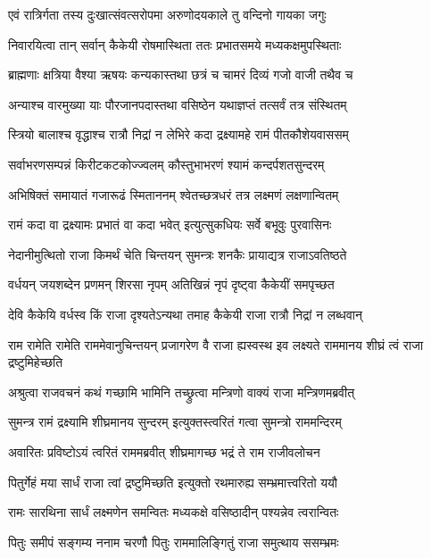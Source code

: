 \twolineshloka
{एवं रात्रिर्गता तस्य दुःखात्संवत्सरोपमा}
{अरुणोदयकाले तु वन्दिनो गायका जगुः} %

\twolineshloka
{निवारयित्वा तान् सर्वान् कैकेयी रोषमास्थिता}
{ततः प्रभातसमये मध्यकक्षमुपस्थिताः} %

\twolineshloka
{ब्राह्मणाः क्षत्रिया वैश्या ऋषयः कन्यकास्तथा}
{छत्रं च चामरं दिव्यं गजो वाजी तथैव च} %

\twolineshloka
{अन्याश्च वारमुख्या याः पौरजानपदास्तथा}
{वसिष्ठेन यथाज्ञप्तं तत्सर्वं तत्र संस्थितम्} %

\twolineshloka
{स्त्रियो बालाश्च वृद्धाश्च रात्रौ निद्रां न लेभिरे}
{कदा द्रक्ष्यामहे रामं पीतकौशेयवाससम्} %

\twolineshloka
{सर्वाभरणसम्पन्नं किरीटकटकोज्ज्वलम्}
{कौस्तुभाभरणं श्यामं कन्दर्पशतसुन्दरम्} %

\twolineshloka
{अभिषिक्तं समायातं गजारूढं स्मिताननम्}
{श्वेतच्छत्रधरं तत्र लक्ष्मणं लक्षणान्वितम्} %

\twolineshloka
{रामं कदा वा द्रक्ष्यामः प्रभातं वा कदा भवेत्}
{इत्युत्सुकधियः सर्वे बभूवुः पुरवासिनः} %

\twolineshloka
{नेदानीमुत्थितो राजा किमर्थं चेति चिन्तयन्}
{सुमन्त्रः शनकैः प्रायाद्यत्र राजाऽवतिष्ठते} %

\twolineshloka
{वर्धयन् जयशब्देन प्रणमन् शिरसा नृपम्}
{अतिखिन्नं नृपं दृष्ट्वा कैकेयीं समपृच्छत} %

\twolineshloka
{देवि कैकेयि वर्धस्व किं राजा दृश्यतेऽन्यथा}
{तमाह कैकेयी राजा रात्रौ निद्रां न लब्धवान्} %

\threelineshloka
{राम रामेति रामेति राममेवानुचिन्तयन्}
{प्रजागरेण वै राजा ह्यस्वस्थ इव लक्ष्यते}
{राममानय शीघ्रं त्वं राजा द्रष्टुमिहेच्छति} %

\twolineshloka
{अश्रुत्वा राजवचनं कथं गच्छामि भामिनि}
{तच्छ्रुत्वा मन्त्रिणो वाक्यं राजा मन्त्रिणमब्रवीत्} %

\twolineshloka
{सुमन्त्र रामं द्रक्ष्यामि शीघ्रमानय सुन्दरम्}
{इत्युक्तस्त्वरितं गत्वा सुमन्त्रो राममन्दिरम्} %

\twolineshloka
{अवारितः प्रविष्टोऽयं त्वरितं राममब्रवीत्}
{शीघ्रमागच्छ भद्रं ते राम राजीवलोचन} %

\twolineshloka
{पितुर्गेहं मया सार्धं राजा त्वां द्रष्टुमिच्छति}
{इत्युक्तो रथमारुह्य सम्भ्रमात्त्वरितो ययौ} %

\twolineshloka
{रामः सारथिना सार्धं लक्ष्मणेन समन्वितः}
{मध्यकक्षे वसिष्ठादीन् पश्यन्नेव त्वरान्वितः} %

\twolineshloka
{पितुः समीपं सङ्गम्य ननाम चरणौ पितुः}
{राममालिङ्गितुं राजा समुत्थाय ससम्भ्रमः} %

